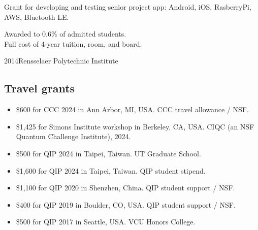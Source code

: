 \documentclass[11pt,letterpaper,serif]{moderncv}
\begin{document}
{
	\begin{adjustwidth}{.25in}{}
		Grant for developing and testing senior project app: Android, iOS, RasberryPi, AWS, Bluetooth LE.
	\end{adjustwidth}
}

{
	\begin{adjustwidth}{.25in}{}
		Awarded to 0.6\% of admitted students.\\
		Full cost of 4-year tuition, room, and board.
	\end{adjustwidth}
}


 {2014}{Rensselaer Polytechnic Institute}{}

\subsection{Travel grants}

\begin{itemize}
	\item \$600 for CCC 2024 in Ann Arbor, MI, USA. CCC travel allowance / NSF.
	\item \$1,425 for Simons Institute workshop in Berkeley, CA, USA. CIQC (an NSF Quantum Challenge Institute), 2024.
	\item \$500 for QIP 2024 in Taipei, Taiwan. UT Graduate School.
	\item \$1,600 for QIP 2024 in Taipei, Taiwan. QIP student stipend.
	\item \$1,100 for QIP 2020 in Shenzhen, China. QIP student support / NSF.
	\item \$400 for QIP 2019 in Boulder, CO, USA. QIP student support / NSF.
	\item \$500 for QIP 2017 in Seattle, USA. VCU Honors College.
\end{itemize}




\end{document}
